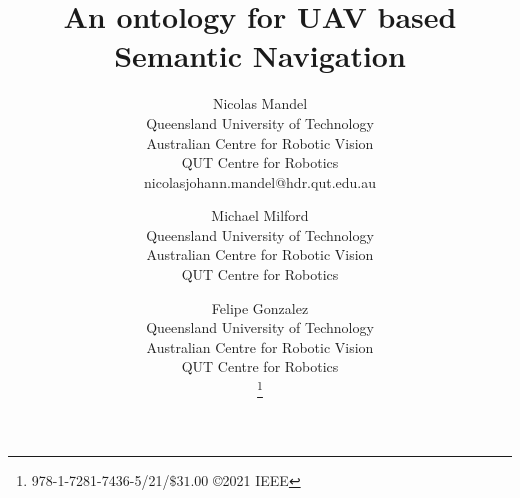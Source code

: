 \documentclass[twocolumn,letterpaper]{IEEEAerospaceCLS}  %
\begin{document}
\title{An ontology for UAV based  Semantic Navigation}

\author{%
    Nicolas Mandel\\
    Queensland University of Technology\\
    Australian Centre for Robotic Vision\\
    QUT Centre for Robotics\\
    nicolasjohann.mandel@hdr.qut.edu.au
    \and
    Michael Milford\\
    Queensland University of Technology\\
    Australian Centre for Robotic Vision\\
    QUT Centre for Robotics\\
    \and
    Felipe Gonzalez\\
    Queensland University of Technology\\
    Australian Centre for Robotic Vision\\
    QUT Centre for Robotics\\
    \thanks{\footnotesize 978-1-7281-7436-5/21/$\$31.00$ \copyright2021 IEEE}              %
}



\maketitle

\thispagestyle{plain}
\pagestyle{plain}



\maketitle

\thispagestyle{plain}
\pagestyle{plain}
\end{document}
